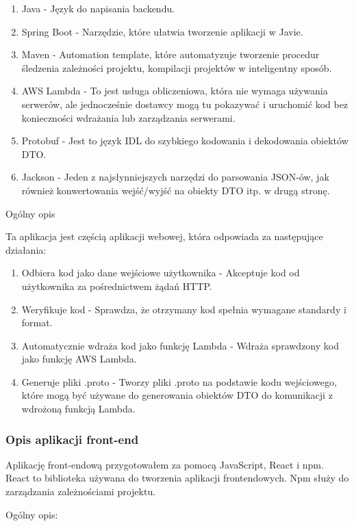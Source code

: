 \documentclass[runningheads,12pt]{llncs}
\begin{document}
\begin{enumerate}
    \item Java - Język do napisania backendu.
    \item Spring Boot - Narzędzie, które ułatwia tworzenie aplikacji w Javie.
    \item Maven - Automation template, które automatyzuje tworzenie procedur śledzenia zależności projektu, kompilacji projektów w inteligentny sposób.
    \item AWS Lambda - To jest usługa obliczeniowa, która nie wymaga używania serwerów, ale jednocześnie dostawcy mogą tu pokazywać i uruchomić kod bez konieczności wdrażania lub zarządzania serwerami.
    \item Protobuf - Jest to język IDL do szybkiego kodowania i dekodowania obiektów DTO.
    \item Jackson - Jeden z najsłynniejszych narzędzi do parsowania JSON-ów, jak również konwertowania wejść/wyjść na obiekty DTO itp. w drugą stronę.
\end{enumerate}

Ogólny opis

Ta aplikacja jest częścią aplikacji webowej, która odpowiada za następujące działania:
\begin{enumerate}
    \item Odbiera kod jako dane wejściowe użytkownika - Akceptuje kod od użytkownika za pośrednictwem żądań HTTP.
    \item Weryfikuje kod - Sprawdza, że otrzymany kod spełnia wymagane standardy i format.
    \item Automatycznie wdraża kod jako funkcję Lambda -  Wdraża sprawdzony kod jako funkcję AWS Lambda.
    \item Generuje pliki .proto - Tworzy pliki .proto na podstawie kodu wejściowego, które mogą być używane do generowania obiektów DTO do komunikacji z wdrożoną funkcją Lambda.
\end{enumerate}


\subsubsection{Opis aplikacji front-end}

Aplikację front-endową przygotowałem za pomocą JavaScript, React i npm.  
React to biblioteka używana do tworzenia aplikacji frontendowych.  
Npm służy do zarządzania zależnościami projektu.

Ogólny opis:
\end{document}
